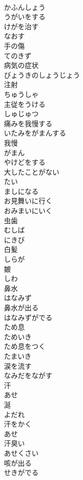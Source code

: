 \documentclass[8pt]{extreport}
\begin{document}
\begin{CJK}{UTF8}{min}
\\	かふんしょう
\\	うがいをする	
\\	けがを治す	
\\	なおす
\\	手の傷	
\\	てのきず
\\	病気の症状	
\\	びょうきのしょうじょう
\\	注射	
\\	ちゅうしゃ
\\	主従をうける	
\\	しゅじゅつ
\\	痛みを我慢する	
\\	いたみをがまんする
\\	我慢	
\\	がまん
\\	やけどをする	
\\	大したことがない	
\\	たい
\\	ましになる	
\\	お見舞いに行く	
\\	おみまいにいく
\\	虫歯	
\\	むしば
\\	にきび	
\\	白髪	
\\	しらが
\\	皴	
\\	しわ
\\	鼻水	
\\	はなみず
\\	鼻水が出る	
\\	はなみずがでる
\\	ため息	
\\	ためいき
\\	ため息をつく	
\\	たまいき
\\	涙を流す	
\\	なみだをながす
\\	汗	
\\	あせ
\\	涎	
\\	よだれ
\\	汗をかく	
\\	あせ
\\	汗臭い	
\\	あせくさい
\\	咳が出る	
\\	せきがでる

\end{CJK}
\end{document}
